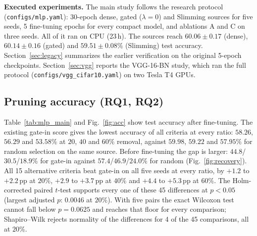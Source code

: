 
\textbf{Executed experiments.} The main study follows the research protocol
(\texttt{configs/mlp.yaml}): 30-epoch dense, gated ($\lambda=0$) and Slimming sources
for five seeds, 5 fine-tuning epochs for every compact model, and ablations A and C on
three seeds. All of it ran on CPU (23\,h). The sources reach $60.06\pm0.17$ (dense),
$60.14\pm0.16$ (gated) and $59.51\pm0.08\%$ (Slimming) test accuracy.
Section~\ref{sec:legacy} summarizes the earlier verification on the original 5-epoch
checkpoints. Section~\ref{sec:vgg} reports the VGG-16-BN study, which ran the full
protocol (\texttt{configs/vgg\_cifar10.yaml}) on two Tesla T4 GPUs.

\subsection{Pruning accuracy (RQ1, RQ2)}
Table~\ref{tab:mlp_main} and Fig.~\ref{fig:acc} show test accuracy after fine-tuning.
The existing gate-in score gives the lowest accuracy of all criteria at every ratio:
$58.26$, $56.29$ and $53.58\%$ at $20$, $40$ and $60\%$ removal, against $59.98$, $59.22$
and $57.95\%$ for random selection on the same source. Before fine-tuning the gap is
larger: $44.8$/$30.5$/$18.9\%$ for gate-in against $57.4$/$46.9$/$24.0\%$ for random
(Fig.~\ref{fig:recovery}). All 15 alternative criteria beat gate-in on all five seeds at
every ratio, by $+1.2$ to $+2.2$\,pp at $20\%$, $+2.9$ to $+3.7$\,pp at $40\%$ and
$+4.4$ to $+5.3$\,pp at $60\%$. The Holm-corrected paired $t$-test supports every one of
these 45 differences at $p<0.05$ (largest adjusted $p$: $0.0046$ at $20\%$). With five
pairs the exact Wilcoxon test cannot fall below $p=0.0625$ and reaches that floor for
every comparison; Shapiro--Wilk rejects normality of the differences for 4 of the 45
comparisons, all at $20\%$.

